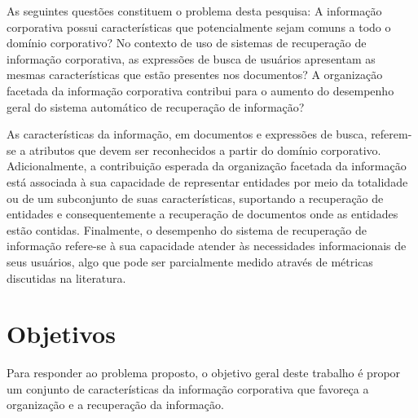As seguintes questões constituem o problema desta pesquisa: 
A informação corporativa possui características que potencialmente sejam comuns a todo o domínio corporativo? 
No contexto de uso de sistemas de recuperação de informação corporativa, as expressões de busca de usuários apresentam as mesmas características que estão presentes nos documentos? 
A organização facetada da informação corporativa contribui para o aumento do desempenho geral do sistema automático de recuperação de informação?

As características da informação, em documentos e expressões de busca, referem-se a atributos que devem ser reconhecidos a partir do domínio corporativo. Adicionalmente, a contribuição esperada da organização facetada da informação está associada à sua capacidade de representar entidades por meio da totalidade ou de um subconjunto de suas características, suportando a recuperação de entidades e consequentemente a recuperação de documentos onde as entidades estão contidas. Finalmente, o desempenho do sistema de recuperação de informação refere-se à sua capacidade atender às necessidades informacionais de seus usuários, algo que pode ser parcialmente medido através de métricas discutidas na literatura.






\section{Objetivos}

Para responder ao problema proposto, o objetivo geral deste trabalho é propor um conjunto de características da informação corporativa que favoreça a organização e a recuperação da informação.

